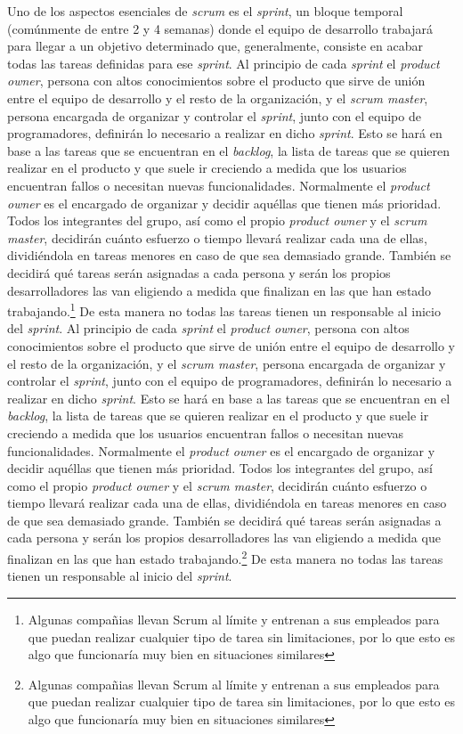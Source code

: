 Uno de los aspectos esenciales de \textit{scrum} es el \textit{sprint}, un bloque temporal (comúnmente de entre 2 y 4 semanas) donde el equipo de desarrollo trabajará para llegar a un objetivo determinado que, generalmente, consiste en acabar todas las tareas definidas para ese \textit{sprint}.
Al principio de cada \textit{sprint} el \textit{product owner}, persona con altos conocimientos sobre el producto que sirve de unión entre el equipo de desarrollo y el resto de la organización, y el \textit{scrum master}, persona encargada de organizar y controlar el \textit{sprint}, junto con el equipo de programadores, definirán lo necesario a realizar en dicho \textit{sprint}. Esto se hará en base a las tareas que se encuentran en el \textit{backlog}, la lista de tareas que se quieren realizar en el producto y que suele ir creciendo a medida que los usuarios encuentran fallos o necesitan nuevas funcionalidades. Normalmente el \textit{product owner} es el encargado de organizar y decidir aquéllas que tienen más prioridad. Todos los integrantes del grupo, así como el propio \textit{product owner} y el \textit{scrum master}, decidirán cuánto esfuerzo o tiempo llevará realizar cada una de ellas, dividiéndola en tareas menores en caso de que sea demasiado grande. También se decidirá qué tareas serán asignadas a cada persona y serán los propios desarrolladores las van eligiendo a medida que finalizan en las que han estado trabajando.\footnote{Algunas compañias llevan Scrum al límite y entrenan a sus empleados para que puedan realizar cualquier tipo de tarea sin limitaciones, por lo que esto es algo que funcionaría muy bien en situaciones similares} De esta manera no todas las tareas tienen un responsable al inicio del \textit{sprint}.
Al principio de cada \textit{sprint} el \textit{product owner}, persona con altos conocimientos sobre el producto que sirve de unión entre el equipo de desarrollo y el resto de la organización, y el \textit{scrum master}, persona encargada de organizar y controlar el \textit{sprint}, junto con el equipo de programadores, definirán lo necesario a realizar en dicho \textit{sprint}. Esto se hará en base a las tareas que se encuentran en el \textit{backlog}, la lista de tareas que se quieren realizar en el producto y que suele ir creciendo a medida que los usuarios encuentran fallos o necesitan nuevas funcionalidades. Normalmente el \textit{product owner} es el encargado de organizar y decidir aquéllas que tienen más prioridad. Todos los integrantes del grupo, así como el propio \textit{product owner} y el \textit{scrum master}, decidirán cuánto esfuerzo o tiempo llevará realizar cada una de ellas, dividiéndola en tareas menores en caso de que sea demasiado grande. También se decidirá qué tareas serán asignadas a cada persona y serán los propios desarrolladores las van eligiendo a medida que finalizan en las que han estado trabajando.\footnote{Algunas compañias llevan Scrum al límite y entrenan a sus empleados para que puedan realizar cualquier tipo de tarea sin limitaciones, por lo que esto es algo que funcionaría muy bien en situaciones similares} De esta manera no todas las tareas tienen un responsable al inicio del \textit{sprint}.

